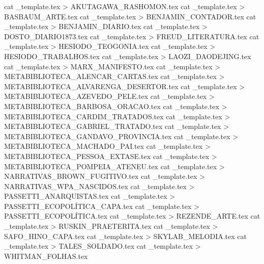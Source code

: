 cat _template.tex > AKUTAGAWA_RASHOMON.tex
cat _template.tex > BASBAUM_ARTE.tex
cat _template.tex > BENJAMIN_CONTADOR.tex
cat _template.tex > BENJAMIN_DIARIO.tex
cat _template.tex > DOSTO_DIARIO1873.tex
cat _template.tex > FREUD_LITERATURA.tex
cat _template.tex > HESIODO_TEOGONIA.tex
cat _template.tex > HESIODO_TRABALHOS.tex
cat _template.tex > LAOZI_DAODEJING.tex
cat _template.tex > MARX_MANIFESTO.tex
cat _template.tex > METABIBLIOTECA_ALENCAR_CARTAS.tex
cat _template.tex > METABIBLIOTECA_ALVARENGA_DESERTOR.tex
cat _template.tex > METABIBLIOTECA_AZEVEDO_PELE.tex
cat _template.tex > METABIBLIOTECA_BARBOSA_ORACAO.tex
cat _template.tex > METABIBLIOTECA_CARDIM_TRATADOS.tex
cat _template.tex > METABIBLIOTECA_GABRIEL_TRATADO.tex
cat _template.tex > METABIBLIOTECA_GANDAVO_PROVINCIA.tex
cat _template.tex > METABIBLIOTECA_MACHADO_PAI.tex
cat _template.tex > METABIBLIOTECA_PESSOA_EXTASE.tex
cat _template.tex > METABIBLIOTECA_POMPEIA_ATENEU.tex
cat _template.tex > NARRATIVAS_BROWN_FUGITIVO.tex
cat _template.tex > NARRATIVAS_WPA_NASCIDOS.tex
cat _template.tex > PASSETTI_ANARQUISTAS.tex
cat _template.tex > PASSETTI_ECOPOLÍTICA_CAPA.tex
cat _template.tex > PASSETTI_ECOPOLÍTICA.tex
cat _template.tex > REZENDE_ARTE.tex
cat _template.tex > RUSKIN_PRAETERITA.tex
cat _template.tex > SAFO_HINO_CAPA.tex
cat _template.tex > SKYLAB_MELODIA.tex
cat _template.tex > TALES_SOLDADO.tex
cat _template.tex > WHITMAN_FOLHAS.tex